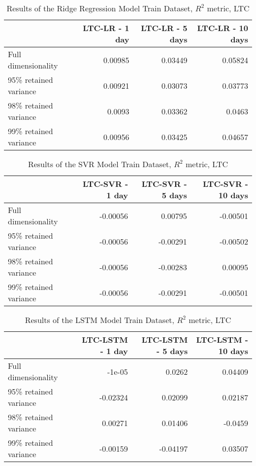 
\begin{table}[htbp]
    \centering
    \caption{Results of the Ridge Regression Model Train Dataset, $R^2$ metric, LTC}
    \begin{tabular}{lrrr}
        \toprule
        {} &  LTC-LR - 1 day &  LTC-LR - 5 days &  LTC-LR - 10 days \\
        \midrule
        Full dimensionality   &    0.00985      &   0.03449       &     0.05824       \\
        95\% retained variance &    0.00921     & 0.03073   &       0.03773    \\
        98\% retained variance &     0.0093  &       0.03362 &    0.0463  \\
        99\% retained variance &    0.00956   &     0.03425    &   0.04657  \\
        \bottomrule
    \end{tabular}
    \end{table}
    
    
    \begin{table}[htbp]
        \centering
        \caption{Results of the SVR Model Train Dataset, $R^2$ metric, LTC}
    \begin{tabular}{lrrr}
        \toprule
        {} &  LTC-SVR - 1 day &  LTC-SVR - 5 days &  LTC-SVR - 10 days \\
        \midrule
        Full dimensionality   &   -0.00056  &    0.00795     &    -0.00501     \\
        95\% retained variance &   -0.00056 &     -0.00291    &      -0.00502     \\
        98\% retained variance &  -0.00056   &     -0.00283    &     0.00095    \\
        99\% retained variance &  -0.00056  &    -0.00291     &   -0.00501  \\
        \bottomrule
    \end{tabular}
    \end{table}
    
    \begin{table}[htbp]
        \centering
        \caption{Results of the LSTM Model Train Dataset, $R^2$ metric, LTC}
    \begin{tabular}{lrrr}
        \toprule
        {} &  LTC-LSTM - 1 day &  LTC-LSTM - 5 days &  LTC-LSTM - 10 days \\
        \midrule
        Full dimensionality   &    -1e-05   &   0.0262        &    0.04409       \\
        95\% retained variance &  -0.02324     &   0.02099        &  0.02187          \\
        98\% retained variance &  0.00271     &    0.01406      &      -0.0459      \\
        99\% retained variance &  -0.00159    &    -0.04197   &     0.03507      \\
        \bottomrule
    \end{tabular}
    \end{table}
    
